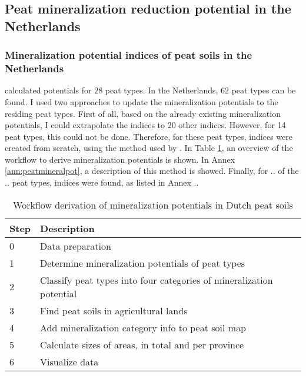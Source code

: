 \documentclass[a4paper,12pt]{scrbook}
\begin{document}
\subsection{Peat mineralization reduction potential in the Netherlands}

\subsubsection{Mineralization potential indices of peat soils in the Netherlands} \label{sec:mineralpotmet}

\citet{stouthamer2008toelichting} calculated potentials for 28 peat types. In the Netherlands, 62 peat types can be found. I used two approaches to update the mineralization potentials to the residing peat types. First of all, based on the already existing mineralization potentials, I could extrapolate the indices to 20 other indices. However, for 14 peat types, this could not be done. Therefore, for these peat types, indices were created from scratch, using the method used by \citet{stouthamer2008toelichting}. In Table \ref{tab:workflowminerpot}, an overview of the workflow to derive mineralization potentials is shown. In Annex \ref{ann:peatmineralpot}, a description of this method is showed. Finally, for .. of the .. peat types, indices were found, as listed in Annex .. 

\begin{table}[htbp]
\caption{Workflow derivation of mineralization potentials in Dutch peat soils}
\begin{center}
\begin{tabular}{|p{3cm}|p{10cm}|}
\hline
\multicolumn{1}{|l|}{\textbf{Step}} & \textbf{Description} \\ \hline
0 & Data preparation \\ \hline
1 & Determine mineralization potentials of peat types \\ \hline
2 & Classify peat types into four categories of mineralization potential \\ \hline
3 & Find peat soils in agricultural lands  \\ \hline
4 & Add mineralization category info to peat soil map \\ \hline
5 & Calculate sizes of areas, in total and per province \\ \hline
6 & Visualize data \\ \hline
\end{tabular}
\end{center}
\label{tab:workflowminerpot}
\end{table}
\end{document}

